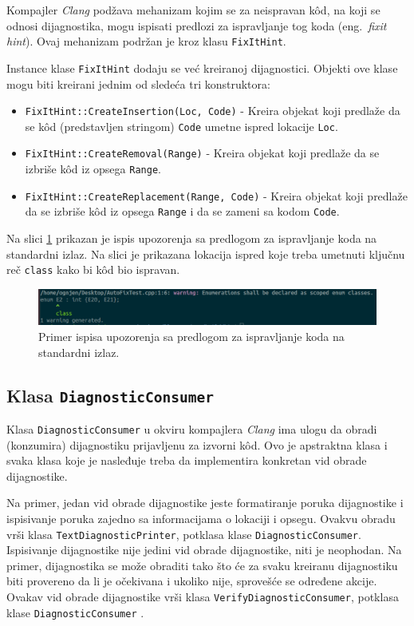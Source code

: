 \documentclass[12pt,oneside]{memoir}
\begin{document}
Kompajler \textit{Clang} pod\v{z}ava mehanizam kojim se za neispravan k\^{o}d, na koji se odnosi dijagnostika, mogu ispisati predlozi za ispravljanje tog koda (eng.~\textit{fixit hint}). Ovaj mehanizam podr\v{z}an je kroz klasu \texttt{FixItHint}.
\par
Instance klase \texttt{FixItHint} dodaju se ve\'{c} kreiranoj dijagnostici. Objekti ove
klase mogu biti kreirani jednim od slede\'{c}a tri konstruktora:

\begin{itemize}
\item \texttt{FixItHint::CreateInsertion(Loc, Code)} - Kreira objekat koji predla\v{z}e da se k\^{o}d (predstavljen stringom) \texttt{Code} umetne ispred lokacije \texttt{Loc}.
\item \texttt{FixItHint::CreateRemoval(Range)} - Kreira objekat koji predla\v{z}e da se izbri\v{s}e k\^{o}d iz opsega \texttt{Range}.
\item \texttt{FixItHint::CreateReplacement(Range, Code)} - Kreira objekat koji predla\v{z}e da se izbri\v{s}e k\^{o}d iz opsega \texttt{Range} i da se zameni sa kodom \texttt{Code}.
\end{itemize}

Na slici \ref{fig:fixit} prikazan je ispis upozorenja sa predlogom za ispravljanje koda na standardni izlaz. Na slici je prikazana lokacija
ispred koje treba umetnuti klju\v{c}nu re\v{c} \texttt{class} kako bi k\^{o}d bio ispravan.

\begin{figure}[!h]
\begin{center}
\includegraphics[scale=0.4]{fixit.png}
\end{center}
\caption{Primer ispisa upozorenja sa predlogom za ispravljanje koda na standardni izlaz.}
\label{fig:fixit}
\end{figure}

\subsection{Klasa \texttt{DiagnosticConsumer}}

Klasa \texttt{DiagnosticConsumer} u okviru kompajlera \textit{Clang} ima ulogu da obradi (konzumira) dijagnostiku prijavljenu
za izvorni k\^{o}d. Ovo je apstraktna klasa i svaka klasa koje je nasleđuje treba da implementira konkretan vid obrade dijagnostike. \par
Na primer, jedan vid obrade dijagnostike jeste formatiranje poruka dijagnostike i ispisivanje poruka zajedno sa informacijama o lokaciji i opsegu.
Ovakvu obradu vr\v{s}i klasa \texttt{TextDiagnosticPrinter}, potklasa klase \texttt{DiagnosticConsumer}.
Ispisivanje dijagnostike nije jedini vid obrade dijagnostike, niti je neophodan. Na primer, dijagnostika se mo\v{z}e obraditi
tako \v{s}to \'{c}e za svaku kreiranu dijagnostiku biti provereno da li je o\v{c}ekivana i ukoliko nije, sprove\v{s}\'{c}e se određene akcije.
Ovakav vid obrade dijagnostike vr\v{s}i klasa \texttt{VerifyDiagnosticConsumer}, potklasa klase \texttt{DiagnosticConsumer} \cite{CFEWebsite}.
\end{document}
